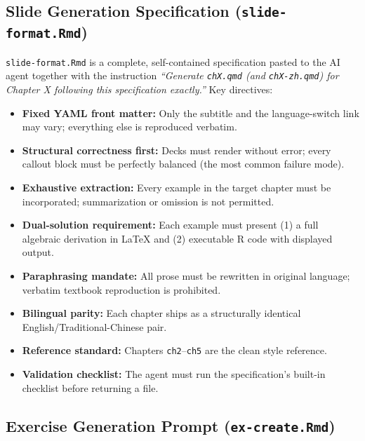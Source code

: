 \documentclass[
]{article}
\providecommand{\tightlist}{%
  \setlength{\itemsep}{0pt}\setlength{\parskip}{0pt}}
\begin{document}
\subsection{\texorpdfstring{Slide Generation Specification
(\texttt{slide-format.Rmd})}{Slide Generation Specification (slide-format.Rmd)}}\label{slide-generation-specification-slide-format.rmd}

\texttt{slide-format.Rmd} is a complete, self-contained specification
pasted to the AI agent together with the instruction \emph{``Generate
\texttt{chX.qmd} (and \texttt{chX-zh.qmd}) for Chapter X following this
specification exactly.''} Key directives:

\begin{itemize}
\tightlist
\item
  \textbf{Fixed YAML front matter:} Only the subtitle and the
  language-switch link may vary; everything else is reproduced verbatim.
\item
  \textbf{Structural correctness first:} Decks must render without
  error; every callout block must be perfectly balanced (the most common
  failure mode).
\item
  \textbf{Exhaustive extraction:} Every example in the target chapter
  must be incorporated; summarization or omission is not permitted.
\item
  \textbf{Dual-solution requirement:} Each example must present (1) a
  full algebraic derivation in LaTeX and (2) executable R code with
  displayed output.
\item
  \textbf{Paraphrasing mandate:} All prose must be rewritten in original
  language; verbatim textbook reproduction is prohibited.
\item
  \textbf{Bilingual parity:} Each chapter ships as a structurally
  identical English/Traditional-Chinese pair.
\item
  \textbf{Reference standard:} Chapters \texttt{ch2}--\texttt{ch5} are
  the clean style reference.
\item
  \textbf{Validation checklist:} The agent must run the specification's
  built-in checklist before returning a file.
\end{itemize}

\subsection{\texorpdfstring{Exercise Generation Prompt
(\texttt{ex-create.Rmd})}{Exercise Generation Prompt (ex-create.Rmd)}}\label{exercise-generation-prompt-ex-create.rmd}
\end{document}
